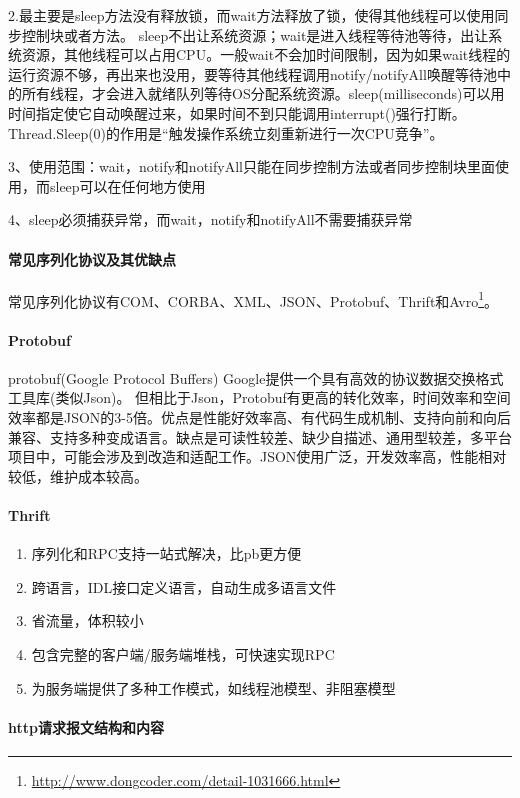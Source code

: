 \documentclass[../../../interview-questions.tex]{subfiles}
\begin{document}
2.最主要是sleep方法没有释放锁，而wait方法释放了锁，使得其他线程可以使用同步控制块或者方法。
sleep不出让系统资源；wait是进入线程等待池等待，出让系统资源，其他线程可以占用CPU。一般wait不会加时间限制，因为如果wait线程的运行资源不够，再出来也没用，要等待其他线程调用notify/notifyAll唤醒等待池中的所有线程，才会进入就绪队列等待OS分配系统资源。sleep(milliseconds)可以用时间指定使它自动唤醒过来，如果时间不到只能调用interrupt()强行打断。
Thread.Sleep(0)的作用是“触发操作系统立刻重新进行一次CPU竞争”。

3、使用范围：wait，notify和notifyAll只能在同步控制方法或者同步控制块里面使用，而sleep可以在任何地方使用

4、sleep必须捕获异常，而wait，notify和notifyAll不需要捕获异常


\paragraph{常见序列化协议及其优缺点}

常见序列化协议有COM、CORBA、XML、JSON、Protobuf、Thrift和Avro\footnote{\url{http://www.dongcoder.com/detail-1031666.html}}。

\paragraph{Protobuf}protobuf(Google Protocol Buffers)
Google提供一个具有高效的协议数据交换格式工具库(类似Json)。
但相比于Json，Protobuf有更高的转化效率，时间效率和空间效率都是JSON的3-5倍。优点是性能好效率高、有代码生成机制、支持向前和向后兼容、支持多种变成语言。缺点是可读性较差、缺少自描述、通用型较差，多平台项目中，可能会涉及到改造和适配工作。JSON使用广泛，开发效率高，性能相对较低，维护成本较高。

\paragraph{Thrift}

\begin{enumerate}
\item {序列化和RPC支持一站式解决，比pb更方便}
\item{跨语言，IDL接口定义语言，自动生成多语言文件}
\item{省流量，体积较小}
\item{包含完整的客户端/服务端堆栈，可快速实现RPC}
\item{为服务端提供了多种工作模式，如线程池模型、非阻塞模型}
\end{enumerate}


\paragraph{http请求报文结构和内容}
\end{document}
